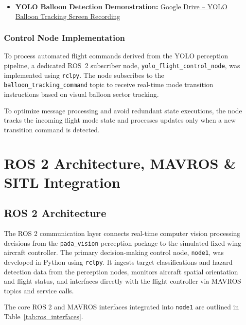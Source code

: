 \documentclass[12pt,a4paper]{article}
\begin{document}
\begin{itemize}
    \item \textbf{YOLO Balloon Detection Demonstration:} \href{https://drive.google.com/file/d/1mZbPPHK5tijk_HDhvavXxqVVk-Z9NiWH/view?usp=sharing}{Google Drive -- YOLO Balloon Tracking Screen Recording}
\end{itemize}

\subsubsection{Control Node Implementation}
To process automated flight commands derived from the YOLO perception pipeline, a dedicated ROS~2 subscriber node, \texttt{yolo\_flight\_control\_node}, was implemented using \texttt{rclpy}. The node subscribes to the \texttt{balloon\_tracking\_command} topic to receive real-time mode transition instructions based on visual balloon sector tracking.

To optimize message processing and avoid redundant state executions, the node tracks the incoming flight mode state and processes updates only when a new transition command is detected.


\section{ROS 2 Architecture, MAVROS \& SITL Integration}

\subsection{ROS 2 Architecture}

The ROS 2 communication layer connects real-time computer vision processing decisions from the \texttt{pada\_vision} perception package to the simulated fixed-wing aircraft controller. The primary decision-making control node, \texttt{node1}, was developed in Python using \texttt{rclpy}. It ingests target classifications and hazard detection data from the perception nodes, monitors aircraft spatial orientation and flight status, and interfaces directly with the flight controller via MAVROS topics and service calls.

The core ROS 2 and MAVROS interfaces integrated into \texttt{node1} are outlined in Table~\ref{tab:ros_interfaces}.
\end{document}
